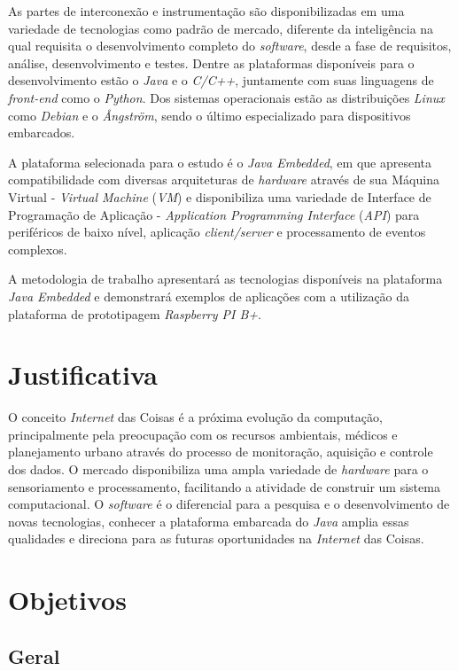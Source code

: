As partes de interconexão e instrumentação são disponibilizadas em uma
variedade de tecnologias como padrão de mercado, diferente da inteligência na
qual requisita o desenvolvimento completo do \textit{software}, desde a fase de
requisitos, análise, desenvolvimento e testes. Dentre as plataformas
disponíveis para o desenvolvimento estão o \textit{Java} e o \textit{C/C++},
juntamente com suas linguagens de \textit{front-end} como o
\textit{Python}. Dos sistemas operacionais estão as distribuições
\textit{Linux} como \textit{Debian} e o \textit{Ångström}, sendo o último
especializado para dispositivos embarcados.

A plataforma selecionada para o estudo é o \textit{Java Embedded}, em que
apresenta compatibilidade com diversas arquiteturas de \textit{hardware}
através de sua Máquina Virtual - \textit{Virtual Machine} (\textit{VM}) e
disponibiliza uma variedade de Interface de Programação de Aplicação -
\textit{Application Programming Interface} (\textit{API}) para periféricos de
baixo nível, aplicação \textit{client/server} e processamento de eventos
complexos.

A metodologia de trabalho apresentará as tecnologias disponíveis na plataforma
\textit{Java Embedded} e demonstrará exemplos de aplicações com a utilização da
plataforma de prototipagem \textit{Raspberry PI B+}.

\section{Justificativa}

O conceito \textit{Internet} das Coisas é a próxima evolução da computação,
principalmente pela preocupação com os recursos ambientais, médicos e
planejamento urbano através do processo de monitoração, aquisição e controle
dos dados. O mercado disponibiliza uma ampla variedade de \textit{hardware}
para o sensoriamento e processamento, facilitando a atividade de construir um
sistema computacional. O \textit{software} é o diferencial para a pesquisa e o
desenvolvimento de novas tecnologias, conhecer a plataforma embarcada do
\textit{Java} amplia essas qualidades e direciona para as futuras oportunidades
na \textit{Internet} das Coisas.

\section{Objetivos}

\subsection{Geral}

